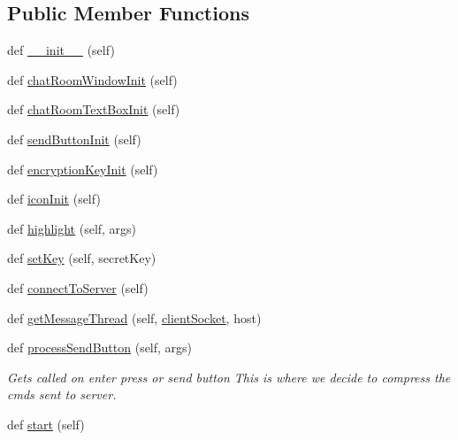 \subsection*{Public Member Functions}
\begin{DoxyCompactItemize}
\item 
def \hyperlink{classgui_version_1_1_chat_client_g_u_i_ae6788c5b8f15cd3ac7a844cee72e06a3}{\+\_\+\+\_\+init\+\_\+\+\_\+} (self)
\item 
def \hyperlink{classgui_version_1_1_chat_client_g_u_i_a768dd49f34840a662bc12636dcb8f18a}{chat\+Room\+Window\+Init} (self)
\item 
def \hyperlink{classgui_version_1_1_chat_client_g_u_i_a1788a126553ae97447343bd9f4187624}{chat\+Room\+Text\+Box\+Init} (self)
\item 
def \hyperlink{classgui_version_1_1_chat_client_g_u_i_ad5e98841e008476eee6015e5b8bf6eee}{send\+Button\+Init} (self)
\item 
def \hyperlink{classgui_version_1_1_chat_client_g_u_i_a16414e83201878b6a1565fdf0600f15a}{encryption\+Key\+Init} (self)
\item 
def \hyperlink{classgui_version_1_1_chat_client_g_u_i_acb99a090317b6806b24e91ef4ac4b0e2}{icon\+Init} (self)
\item 
def \hyperlink{classgui_version_1_1_chat_client_g_u_i_ac68b416d5a4d4962b76752f1aa78bccb}{highlight} (self, args)
\item 
def \hyperlink{classgui_version_1_1_chat_client_g_u_i_ad0b24322eeb5217d9410ee68fb054d42}{set\+Key} (self, secret\+Key)
\item 
def \hyperlink{classgui_version_1_1_chat_client_g_u_i_a976bddea0e9e23dd9e2245aa002a354f}{connect\+To\+Server} (self)
\item 
def \hyperlink{classgui_version_1_1_chat_client_g_u_i_a8de44a4f22866fe79ee14d0536120fa4}{get\+Message\+Thread} (self, \hyperlink{classgui_version_1_1_chat_client_g_u_i_ad0d119fff1856994d498e1e9861451d5}{client\+Socket}, host)
\item 
def \hyperlink{classgui_version_1_1_chat_client_g_u_i_afbeef14d848917e111de1d91e325662c}{process\+Send\+Button} (self, args)
\begin{DoxyCompactList}\small\item\em Gets called on enter press or send button This is where we decide to compress the cmds sent to server. \end{DoxyCompactList}\item 
def \hyperlink{classgui_version_1_1_chat_client_g_u_i_a0211f17468f8c004ca4d22dec90f6e5f}{start} (self)
\end{DoxyCompactItemize}
